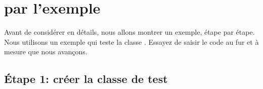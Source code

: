 \documentclass[a4paper,10pt,twoside]{book}
\begin{document}


\section{\sunit par l'exemple}

Avant de considérer \SUnit en détails, nous allons montrer un exemple, étape par étape. Nous utilisons un exemple qui teste la classe . Essayez de saisir le code au fur et à mesure que nous avançons.
\subsection{Étape 1: créer la classe de test}

\end{document}
